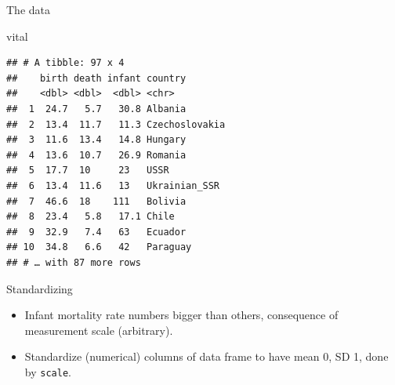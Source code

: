 \documentclass[ignorenonframetext,]{beamer}
\newenvironment{Shaded}{\begin{snugshade}}{\end{snugshade}}
\newcommand{\KeywordTok}[1]{\textcolor[rgb]{0.13,0.29,0.53}{\textbf{#1}}}
\newcommand{\NormalTok}[1]{#1}
\newcommand{\OperatorTok}[1]{\textcolor[rgb]{0.81,0.36,0.00}{\textbf{#1}}}
\newcommand{\StringTok}[1]{\textcolor[rgb]{0.31,0.60,0.02}{#1}}
\begin{document}
\begin{frame}[fragile]{The data}
\protect\hypertarget{the-data-11}{}

\begin{Shaded}
\begin{Highlighting}[]
\NormalTok{vital}
\end{Highlighting}
\end{Shaded}

\begin{verbatim}
## # A tibble: 97 x 4
##    birth death infant country       
##    <dbl> <dbl>  <dbl> <chr>         
##  1  24.7   5.7   30.8 Albania       
##  2  13.4  11.7   11.3 Czechoslovakia
##  3  11.6  13.4   14.8 Hungary       
##  4  13.6  10.7   26.9 Romania       
##  5  17.7  10     23   USSR          
##  6  13.4  11.6   13   Ukrainian_SSR 
##  7  46.6  18    111   Bolivia       
##  8  23.4   5.8   17.1 Chile         
##  9  32.9   7.4   63   Ecuador       
## 10  34.8   6.6   42   Paraguay      
## # … with 87 more rows
\end{verbatim}

\end{frame}

\begin{frame}[fragile]{Standardizing}
\protect\hypertarget{standardizing}{}

\begin{itemize}
\item
  Infant mortality rate numbers bigger than others, consequence of
  measurement scale (arbitrary).
\item
  Standardize (numerical) columns of data frame to have mean 0, SD 1,
  done by \texttt{scale}.
\end{itemize}

\begin{Shaded}
\end{Shaded}

\end{frame}
\end{document}
